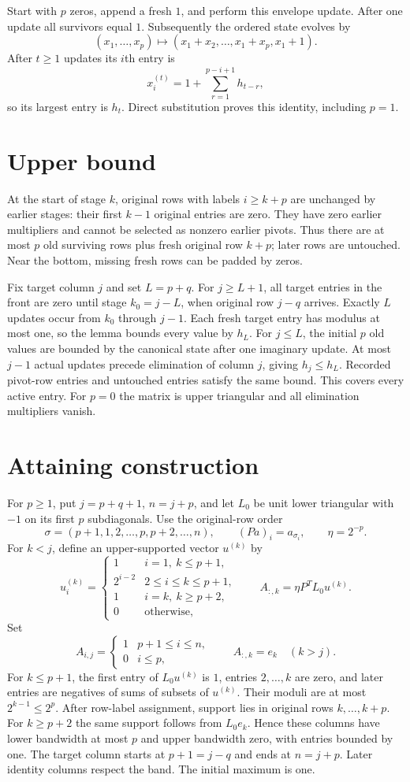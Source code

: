 \documentclass[11pt]{article}
\begin{document}
Start with $p$ zeros, append a fresh $1$, and perform this envelope update. After one update all survivors equal $1$. Subsequently the ordered state evolves by
\[
(x_1,\ldots,x_p)\mapsto(x_1+x_2,\ldots,x_1+x_p,x_1+1).
\]
After $t\ge1$ updates its $i$th entry is
\[
x_i^{(t)}=1+\sum_{r=1}^{p-i+1}h_{t-r},
\]
so its largest entry is $h_t$. Direct substitution proves this identity, including $p=1$.
\section{Upper bound}
At the start of stage $k$, original rows with labels $i\ge k+p$ are unchanged by earlier stages: their first $k-1$ original entries are zero. They have zero earlier multipliers and cannot be selected as nonzero earlier pivots. Thus there are at most $p$ old surviving rows plus fresh original row $k+p$; later rows are untouched. Near the bottom, missing fresh rows can be padded by zeros.

Fix target column $j$ and set $L=p+q$. For $j\ge L+1$, all target entries in the front are zero until stage $k_0=j-L$, when original row $j-q$ arrives. Exactly $L$ updates occur from $k_0$ through $j-1$. Each fresh target entry has modulus at most one, so the lemma bounds every value by $h_L$. For $j\le L$, the initial $p$ old values are bounded by the canonical state after one imaginary update. At most $j-1$ actual updates precede elimination of column $j$, giving $h_j\le h_L$. Recorded pivot-row entries and untouched entries satisfy the same bound. This covers every active entry. For $p=0$ the matrix is upper triangular and all elimination multipliers vanish.
\section{Attaining construction}
For $p\ge1$, put $j=p+q+1$, $n=j+p$, and let $L_0$ be unit lower triangular with $-1$ on its first $p$ subdiagonals. Use the original-row order
\[
\sigma=(p+1,1,2,\ldots,p,p+2,\ldots,n),\qquad (Pa)_i=a_{\sigma_i},\qquad \eta=2^{-p}.
\]
For $k<j$, define an upper-supported vector $u^{(k)}$ by
\[
u_i^{(k)}=\begin{cases}
1&i=1,\ k\le p+1,\\
2^{i-2}&2\le i\le k\le p+1,\\
1&i=k,\ k\ge p+2,\\
0&\text{otherwise},
\end{cases}
\qquad A_{:,k}=\eta P^TL_0u^{(k)}.
\]
Set
\[
A_{i,j}=\begin{cases}1&p+1\le i\le n,\\0&i\le p,\end{cases}
\qquad A_{:,k}=e_k\quad(k>j).
\]
For $k\le p+1$, the first entry of $L_0u^{(k)}$ is $1$, entries $2,\ldots,k$ are zero, and later entries are negatives of sums of subsets of $u^{(k)}$. Their moduli are at most $2^{k-1}\le2^p$. After row-label assignment, support lies in original rows $k,\ldots,k+p$. For $k\ge p+2$ the same support follows from $L_0e_k$. Hence these columns have lower bandwidth at most $p$ and upper bandwidth zero, with entries bounded by one. The target column starts at $p+1=j-q$ and ends at $n=j+p$. Later identity columns respect the band. The initial maximum is one.
\end{document}
